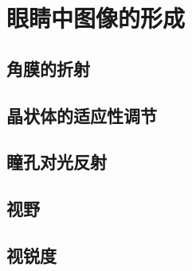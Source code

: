 \section{眼睛中图像的形成}
\subsection{角膜的折射}
\subsection{晶状体的适应性调节}
\subsection{瞳孔对光反射}
\subsection{视野}
\subsection{视锐度}

